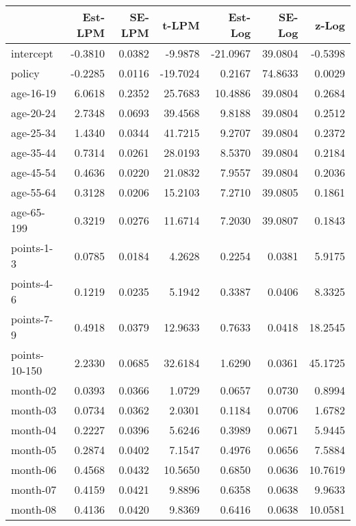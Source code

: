 \documentclass[10pt]{article}
\begin{document}

\begin{table}[ht]
\centering
\begin{tabular}{lrrrrrr}
  \hline
 & Est-LPM & SE-LPM & t-LPM & Est-Log & SE-Log & z-Log \\ 
  \hline
intercept & -0.3810 & 0.0382 & -9.9878 & -21.0967 & 39.0804 & -0.5398 \\ 
  policy & -0.2285 & 0.0116 & -19.7024 & 0.2167 & 74.8633 & 0.0029 \\ 
  age-16-19 & 6.0618 & 0.2352 & 25.7683 & 10.4886 & 39.0804 & 0.2684 \\ 
  age-20-24 & 2.7348 & 0.0693 & 39.4568 & 9.8188 & 39.0804 & 0.2512 \\ 
  age-25-34 & 1.4340 & 0.0344 & 41.7215 & 9.2707 & 39.0804 & 0.2372 \\ 
  age-35-44 & 0.7314 & 0.0261 & 28.0193 & 8.5370 & 39.0804 & 0.2184 \\ 
  age-45-54 & 0.4636 & 0.0220 & 21.0832 & 7.9557 & 39.0804 & 0.2036 \\ 
  age-55-64 & 0.3128 & 0.0206 & 15.2103 & 7.2710 & 39.0805 & 0.1861 \\ 
  age-65-199 & 0.3219 & 0.0276 & 11.6714 & 7.2030 & 39.0807 & 0.1843 \\ 
  points-1-3 & 0.0785 & 0.0184 & 4.2628 & 0.2254 & 0.0381 & 5.9175 \\ 
  points-4-6 & 0.1219 & 0.0235 & 5.1942 & 0.3387 & 0.0406 & 8.3325 \\ 
  points-7-9 & 0.4918 & 0.0379 & 12.9633 & 0.7633 & 0.0418 & 18.2545 \\ 
  points-10-150 & 2.2330 & 0.0685 & 32.6184 & 1.6290 & 0.0361 & 45.1725 \\ 
  month-02 & 0.0393 & 0.0366 & 1.0729 & 0.0657 & 0.0730 & 0.8994 \\ 
  month-03 & 0.0734 & 0.0362 & 2.0301 & 0.1184 & 0.0706 & 1.6782 \\ 
  month-04 & 0.2227 & 0.0396 & 5.6246 & 0.3989 & 0.0671 & 5.9445 \\ 
  month-05 & 0.2874 & 0.0402 & 7.1547 & 0.4976 & 0.0656 & 7.5884 \\ 
  month-06 & 0.4568 & 0.0432 & 10.5650 & 0.6850 & 0.0636 & 10.7619 \\ 
  month-07 & 0.4159 & 0.0421 & 9.8896 & 0.6358 & 0.0638 & 9.9633 \\ 
  month-08 & 0.4136 & 0.0420 & 9.8369 & 0.6416 & 0.0638 & 10.0581 \\ 

\end{tabular}
\end{table}
\end{document}
